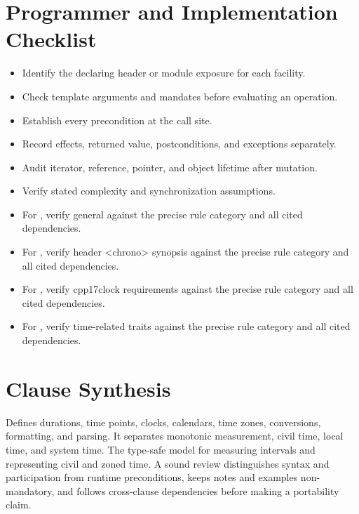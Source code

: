 \documentclass[11pt,letterpaper]{article}
\begin{document}
\section{Programmer and Implementation Checklist}
\begin{CornellReferenceChecklistBox}\begin{itemize}[label=$\square$]
\item Identify the declaring header or module exposure for each facility.
\item Check template arguments and mandates before evaluating an operation.
\item Establish every precondition at the call site.
\item Record effects, returned value, postconditions, and exceptions separately.
\item Audit iterator, reference, pointer, and object lifetime after mutation.
\item Verify stated complexity and synchronization assumptions.
\item For , verify general against the precise rule category and all cited dependencies.
\item For , verify header <chrono> synopsis against the precise rule category and all cited dependencies.
\item For , verify cpp17clock requirements against the precise rule category and all cited dependencies.
\item For , verify time-related traits against the precise rule category and all cited dependencies.
\end{itemize}\end{CornellReferenceChecklistBox}
\section{Clause Synthesis}
\begin{CornellReferenceOrientationBox}Defines durations, time points, clocks, calendars, time zones, conversions, formatting, and parsing. It separates monotonic measurement, civil time, local time, and system time. The type-safe model for measuring intervals and representing civil and zoned time. A sound review distinguishes syntax and participation from runtime preconditions, keeps notes and examples non-mandatory, and follows cross-clause dependencies before making a portability claim.\end{CornellReferenceOrientationBox}
\end{document}
